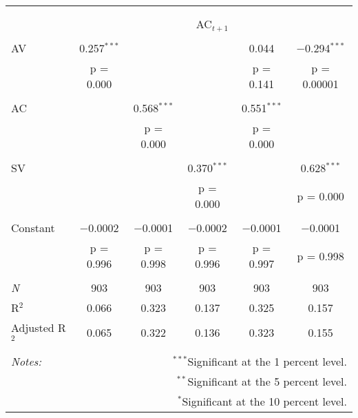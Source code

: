 
\begin{tabular}{@{\extracolsep{5pt}}lccccc} 
\\[-1.8ex]\hline 
\hline \\[-1.8ex] 
\\[-1.8ex] & \multicolumn{5}{c}{AC$_{t+1}$} \\ 
\hline \\[-1.8ex] 
 AV & 0.257$^{***}$ &  &  & 0.044 & $-$0.294$^{***}$ \\ 
  & p = 0.000 &  &  & p = 0.141 & p = 0.00001 \\ 
  & & & & & \\ 
 AC &  & 0.568$^{***}$ &  & 0.551$^{***}$ &  \\ 
  &  & p = 0.000 &  & p = 0.000 &  \\ 
  & & & & & \\ 
 SV &  &  & 0.370$^{***}$ &  & 0.628$^{***}$ \\ 
  &  &  & p = 0.000 &  & p = 0.000 \\ 
  & & & & & \\ 
 Constant & $-$0.0002 & $-$0.0001 & $-$0.0002 & $-$0.0001 & $-$0.0001 \\ 
  & p = 0.996 & p = 0.998 & p = 0.996 & p = 0.997 & p = 0.998 \\ 
  & & & & & \\ 
\textit{N} & 903 & 903 & 903 & 903 & 903 \\ 
R$^{2}$ & 0.066 & 0.323 & 0.137 & 0.325 & 0.157 \\ 
Adjusted R$^{2}$ & 0.065 & 0.322 & 0.136 & 0.323 & 0.155 \\ 
\hline 
\hline \\[-1.8ex] 
\textit{Notes:} & \multicolumn{5}{r}{$^{***}$Significant at the 1 percent level.} \\ 
 & \multicolumn{5}{r}{$^{**}$Significant at the 5 percent level.} \\ 
 & \multicolumn{5}{r}{$^{*}$Significant at the 10 percent level.} \\ 
\end{tabular} 
